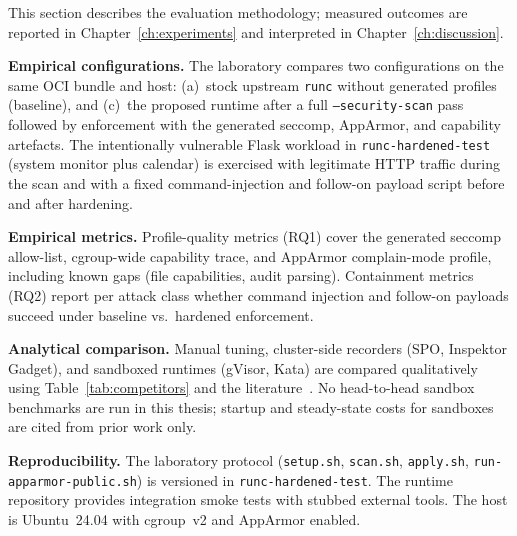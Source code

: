 This section describes the evaluation methodology; measured outcomes are reported in Chapter~\ref{ch:experiments} and interpreted in Chapter~\ref{ch:discussion}.

\textbf{Empirical configurations.} The laboratory compares two configurations on the same OCI bundle and host: (a)~stock upstream \texttt{runc} without generated profiles (baseline), and (c)~the proposed runtime after a full \texttt{--security-scan} pass followed by enforcement with the generated seccomp, AppArmor, and capability artefacts. The intentionally vulnerable Flask workload in \texttt{runc-hardened-test} (system monitor plus calendar) is exercised with legitimate HTTP traffic during the scan and with a fixed command-injection and follow-on payload script before and after hardening.

\textbf{Empirical metrics.} Profile-quality metrics (RQ1) cover the generated seccomp allow-list, cgroup-wide capability trace, and AppArmor complain-mode profile, including known gaps (file capabilities, audit parsing). Containment metrics (RQ2) report per attack class whether command injection and follow-on payloads succeed under baseline vs.\ hardened enforcement. 

\textbf{Analytical comparison.} Manual tuning, cluster-side recorders (SPO, Inspektor Gadget), and sandboxed runtimes (gVisor, Kata) are compared qualitatively using Table~\ref{tab:competitors} and the literature~\cite{wang2022,viktorsson2020,volpert2024}. No head-to-head sandbox benchmarks are run in this thesis; startup and steady-state costs for sandboxes are cited from prior work only.

\textbf{Reproducibility.} The laboratory protocol (\texttt{setup.sh}, \texttt{scan.sh}, \texttt{apply.sh}, \texttt{run-apparmor-public.sh}) is versioned in \texttt{runc-hardened-test}. The runtime repository provides integration smoke tests with stubbed external tools. The host is Ubuntu~24.04 with cgroup~v2 and AppArmor enabled.

